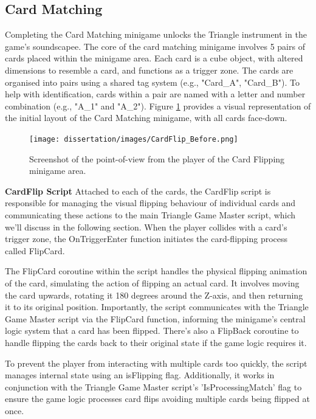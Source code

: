 \documentclass{l4proj}
\begin{document}
\subsection{Card Matching}
Completing the Card Matching minigame unlocks the Triangle instrument in the game's soundscapee. The core of the card matching minigame involves 5 pairs of cards placed within the minigame area. Each card is a cube object, with altered dimensions to resemble a card, and functions as a trigger zone.  The cards are organised into pairs using a shared tag system (e.g., "Card\_A", "Card\_B"). To help with identification, cards within a pair are named with a letter and number combination (e.g., "A\_1" and "A\_2"). Figure \ref{fig:card_matching_overview} provides a visual representation of the initial layout of the Card Matching minigame, with all cards face-down.

\begin{figure}[h]
  \centering
  \texttt{[image: dissertation/images/CardFlip\_Before.png]} 

  \caption{Screenshot of the point-of-view from the player of the Card Flipping minigame area.}

  \label{fig:card_matching_overview} 
\end{figure}

\textbf{CardFlip Script} \newline
Attached to each of the cards, the CardFlip script is responsible for managing the visual flipping behaviour of individual cards and communicating these actions to the main Triangle Game Master script, which we'll discuss in the following section. When the player collides with a card's trigger zone, the OnTriggerEnter function initiates the card-flipping process called FlipCard.

The FlipCard coroutine within the script handles the physical flipping animation of the card, simulating the action of flipping an actual card. It involves moving the card upwards, rotating it 180 degrees around the Z-axis, and then returning it to its original position. Importantly, the script communicates with the Triangle Game Master script via the FlipCard function, informing the minigame's central logic system that a card has been flipped. There's also a FlipBack coroutine to handle flipping the cards back to their original state if the game logic requires it.

To prevent the player from interacting with multiple cards too quickly, the script manages internal state using an isFlipping flag. Additionally, it works in conjunction with the Triangle Game Master script's 'IsProcessingMatch' flag to ensure the game logic processes card flips avoiding multiple cards being flipped at once.
\end{document}
